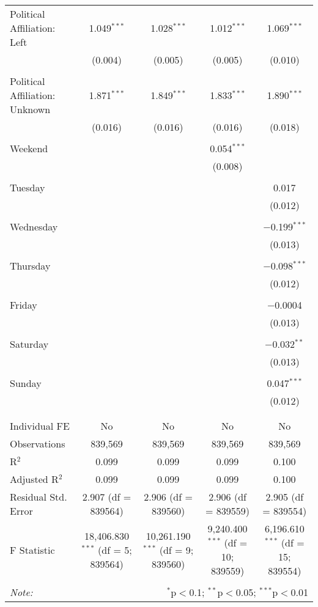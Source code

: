 \documentclass[
]{article}
\begin{document}
\begin{table}[!htbp]
{\begin{tabular}{@{\extracolsep{5pt}}lcccc}
 Political Affiliation: Left & 1.049$^{***}$ & 1.028$^{***}$ & 1.012$^{***}$ & 1.069$^{***}$ \\ 
  & (0.004) & (0.005) & (0.005) & (0.010) \\ 
  & & & & \\ 
 Political Affiliation: Unknown & 1.871$^{***}$ & 1.849$^{***}$ & 1.833$^{***}$ & 1.890$^{***}$ \\ 
  & (0.016) & (0.016) & (0.016) & (0.018) \\ 
  & & & & \\ 
 Weekend &  &  & 0.054$^{***}$ &  \\ 
  &  &  & (0.008) &  \\ 
  & & & & \\ 
 Tuesday &  &  &  & 0.017 \\ 
  &  &  &  & (0.012) \\ 
  & & & & \\ 
 Wednesday &  &  &  & $-$0.199$^{***}$ \\ 
  &  &  &  & (0.013) \\ 
  & & & & \\ 
 Thursday &  &  &  & $-$0.098$^{***}$ \\ 
  &  &  &  & (0.012) \\ 
  & & & & \\ 
 Friday &  &  &  & $-$0.0004 \\ 
  &  &  &  & (0.013) \\ 
  & & & & \\ 
 Saturday &  &  &  & $-$0.032$^{**}$ \\ 
  &  &  &  & (0.013) \\ 
  & & & & \\ 
 Sunday &  &  &  & 0.047$^{***}$ \\ 
  &  &  &  & (0.012) \\ 
  & & & & \\ 
\hline \\[-1.8ex] 
Individual FE & No & No & No & No \\ 
Observations & 839,569 & 839,569 & 839,569 & 839,569 \\ 
R$^{2}$ & 0.099 & 0.099 & 0.099 & 0.100 \\ 
Adjusted R$^{2}$ & 0.099 & 0.099 & 0.099 & 0.100 \\ 
Residual Std. Error & 2.907 (df = 839564) & 2.906 (df = 839560) & 2.906 (df = 839559) & 2.905 (df = 839554) \\ 
F Statistic & 18,406.830$^{***}$ (df = 5; 839564) & 10,261.190$^{***}$ (df = 9; 839560) & 9,240.400$^{***}$ (df = 10; 839559) & 6,196.610$^{***}$ (df = 15; 839554) \\ 
\hline 
\hline \\[-1.8ex] 
\textit{Note:}  & \multicolumn{4}{r}{$^{*}$p$<$0.1; $^{**}$p$<$0.05; $^{***}$p$<$0.01} \\ 
\end{tabular}
} 
\end{table} 
\newpage
\end{document}
